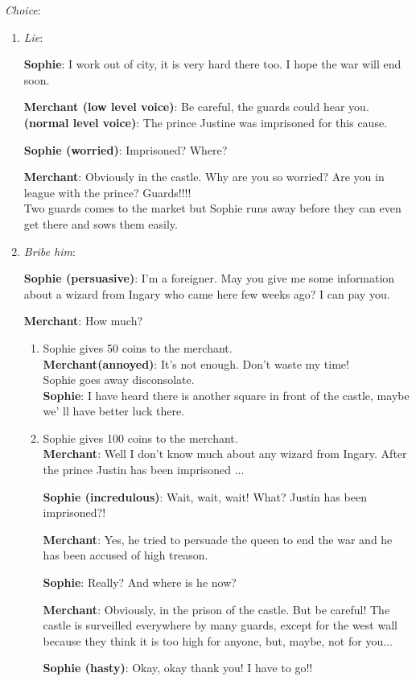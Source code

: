 \noindent \textit{Choice}:
\begin{enumerate}
\item \textit{Lie}:
  
  \textbf{Sophie}: I work out of city, it is very hard there too. I hope the war will end soon.
  
  \textbf{Merchant (low level voice)}: Be careful, the guards could hear you. \textbf{(normal level voice)}: The prince Justine was imprisoned for this cause.
  
  \textbf{Sophie (worried)}: Imprisoned? Where? 

  \textbf{Merchant}: Obviously in the castle. Why are you so worried? Are you in league with the prince? Guards!!!!\\

  Two guards comes to the market but Sophie runs away before they can even get there and sows them easily. 
  
\item \textit{Bribe him}:
  
  \textbf{Sophie (persuasive)}: I'm a foreigner. May you give me some information about a wizard from Ingary who came here few weeks ago? I can pay you.
  
  \textbf{Merchant}: How much?
  
  \begin{enumerate}
  \item Sophie gives 50 coins to the merchant.\\

    \textbf{Merchant(annoyed)}: It’s not enough. Don’t waste my time!\\

    \noindent Sophie goes away disconsolate. \\
    
    \textbf{Sophie}: I have heard there is another square in front of the castle, maybe we' ll have better luck there.

  \item Sophie gives 100 coins to the merchant.\\
    
    \textbf{Merchant}: Well I don't know much about any wizard from Ingary. After the prince Justin has been imprisoned ...

    \textbf{Sophie (incredulous)}: Wait, wait, wait! What? Justin has been imprisoned?!
    
    \textbf{Merchant}: Yes, he tried to persuade the queen to end the war and he has been accused of high treason.
    
    \textbf{Sophie}: Really? And where is he now?
    
    \textbf{Merchant}: Obviously, in the prison of the castle. But be careful! The castle is surveilled everywhere by many guards, except for the west wall because they think it is too high for anyone, but, maybe, not for you...
    
    \textbf{Sophie (hasty)}: Okay, okay thank you! I have to go!!\\

    
  \end{enumerate}
\end{enumerate}


